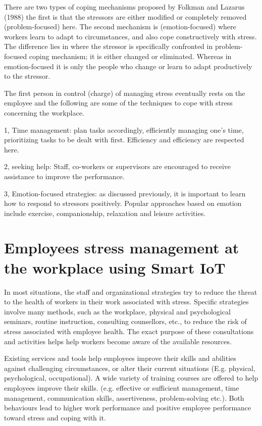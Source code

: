 There are two types of coping mechanisms proposed by Folkman and Lazarus (1988) the first is that the stressors are either modified or completely removed (problem-focused) here. The second mechanism is (emotion-focused) where workers learn to adapt to circumstances, and also cope constructively with stress.  The difference lies in where the stressor is specifically confronted in problem-focused coping mechanism; it is either changed or eliminated. Whereas in emotion-focused it is only the people who change or learn to adapt productively to the stressor. \citep[p.326]{Bloisi2007ManagementBehaviour}

The first person in control (charge) of managing stress eventually rests on the employee and the following are some of the techniques to cope with stress concerning the workplace.

1, Time management: plan tasks accordingly, efficiently managing one's time, prioritizing tasks to be dealt with first. Efficiency and efficiency are respected here.

2, seeking help: Staff, co-workers or supervisors are encouraged to receive assistance to improve the performance.

3, Emotion-focused strategies: as discussed previously, it is important to learn how to respond to stressors positively. Popular approaches based on emotion include exercise, companionship, relaxation and leisure activities. \citep[p.328-333]{Bloisi2007ManagementBehaviour}

\section{Employees stress management at the workplace using Smart \acs{IoT}}
In most situations, the staff and organizational strategies try to reduce the threat to the health of workers in their work associated with stress.  Specific strategies involve many methods, such as the workplace, physical and psychological seminars, routine instruction, consulting counsellors, etc., to reduce the risk of stress associated with employee health. The exact purpose of these consultations and activities helps help workers become aware of the available resources.

Existing services and tools help employees improve their skills and abilities against challenging circumstances, or alter their current situations (E.g. physical, psychological, occupational). A wide variety of training courses are offered to help employees improve their skills.  (e.g. effective or sufficient management, time management, communication skills, assertiveness, problem-solving etc.)\citep{Michie2002CausesWork.}. Both behaviours lead to higher work performance and positive employee performance toward stress and coping with it. 

